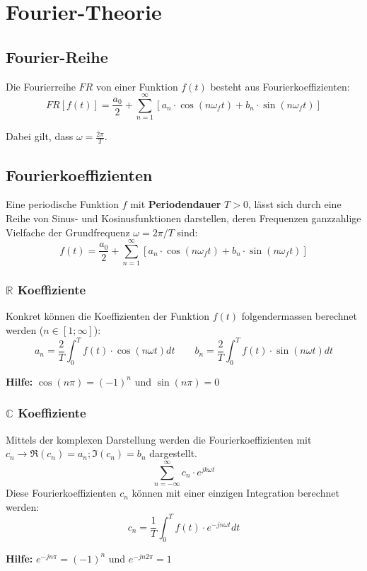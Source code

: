 \section{Fourier-Theorie}
\subsection{Fourier-Reihe}
Die Fourierreihe $FR$ von einer Funktion $f(t)$ besteht aus Fourierkoeffizienten:
\[
FR[f(t)] = \frac{a_0}{2} + \sum_{n = 1}^{\infty}[a_n \cdot \cos(n\omega_ft) + b_n \cdot \sin(n\omega_ft)]
\]

\noindent Dabei gilt, dass $\omega = \frac{2\pi}{T}$.

\subsection{Fourierkoeffizienten}
Eine periodische Funktion $f$ mit \textbf{Periodendauer} $T > 0$, lässt sich durch eine Reihe von Sinus- und Kosinusfunktionen darstellen, deren Frequenzen ganzzahlige Vielfache der Grundfrequenz $\omega = 2\pi/T$ sind:
\[f(t) = \frac{a_0}{2} + \sum_{n = 1}^{\infty}[a_n \cdot \cos(n\omega_ft) + b_n \cdot \sin(n\omega_ft)]\]
\subsubsection{$\mathbb{R}$ Koeffiziente}
\noindent Konkret können die Koeffizienten der Funktion $f(t)$ folgendermassen berechnet werden ($n \in [1;\infty]$):
\[
a_n = \frac{2}{T}\int_{0}^{T}f(t) \cdot \cos(n\omega t)dt \qquad b_n = \frac{2}{T}\int_{0}^{T}f(t) \cdot \sin(n\omega t)dt
\]

\noindent\textbf{Hilfe:} $\cos(n\pi) = (-1)^n$ und $\sin(n\pi) = 0$ 
~\\

\subsubsection{$\mathbb{C}$ Koeffiziente}
\noindent Mittels der komplexen Darstellung werden die Fourierkoeffizienten mit $c_n \rightarrow \Re(c_n) = a_n; \Im(c_n) = b_n$ dargestellt.
\[
\sum_{n=-\infty}^{\infty}c_n \cdot e^{jk\omega t}
\]
Diese Fourierkoeffizienten $c_n$ können mit einer einzigen Integration berechnet werden:
\[
c_n = \frac{1}{T} \int_{0}^{T}f(t)\cdot e^{-jn\omega t} dt
\]

\noindent\textbf{Hilfe:} $e^{-jn\pi} = (-1)^n$ und $e^{-jn2\pi} = 1$

